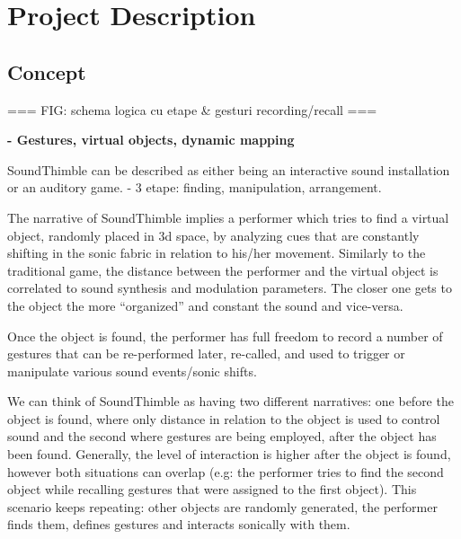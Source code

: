 \documentclass{nime-alternate}
\begin{document}
\section{Project Description}

\subsection{Concept}

=== FIG: schema logica cu etape \& gesturi recording/recall ===

\textbf{- Gestures, virtual objects, dynamic mapping}\\ \par

SoundThimble can be described as either being an interactive sound installation or an auditory game.
- 3 etape: finding, manipulation, arrangement.


The narrative of SoundThimble implies a performer which tries to find a virtual object, randomly placed in 3d space, by analyzing cues that are constantly shifting in the sonic fabric in relation to his/her movement. Similarly to the traditional game, the distance between the performer and the virtual object is correlated to sound synthesis and modulation parameters. The closer one gets to the object the more “organized”  and constant the sound and vice-versa. 

Once the object is found, the performer has full freedom to record a number of gestures that can be re-performed later, re-called, and used to trigger or manipulate various sound events/sonic shifts. 




We can think of SoundThimble as having two different narratives: one before the object is found, where only distance in relation to the object is used to control sound and the second where gestures are being employed, after the object has been found. 
Generally, the level of interaction is higher after the object is found, however both situations can overlap (e.g: the performer tries to find the second object while recalling gestures that were assigned to the first object). This scenario keeps repeating: other objects are randomly generated, the performer finds them, defines gestures and interacts sonically with them.
\end{document}
